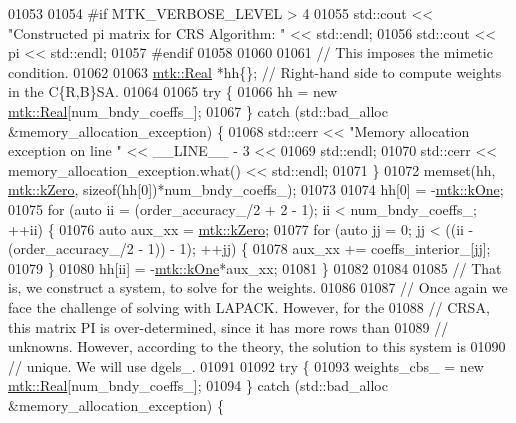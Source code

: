 \begin{DoxyCode}
{{01053 
01054 \textcolor{preprocessor}{  #if MTK\_VERBOSE\_LEVEL > 4}
01055   std::cout << \textcolor{stringliteral}{"Constructed pi matrix for CRS Algorithm: "} << std::endl;
01056   std::cout << pi << std::endl;
01057 \textcolor{preprocessor}{  #endif}
01058 
01060 
01061   \textcolor{comment}{// This imposes the mimetic condition.}
01062 
01063   \hyperlink{group__c01-roots_gac080bbbf5cbb5502c9f00405f894857d}{mtk::Real} *hh\{\};  \textcolor{comment}{// Right-hand side to compute weights in the C\{R,B\}SA.}
01064 
01065   \textcolor{keywordflow}{try} \{
01066     hh = \textcolor{keyword}{new} \hyperlink{group__c01-roots_gac080bbbf5cbb5502c9f00405f894857d}{mtk::Real}[num\_bndy\_coeffs\_];
01067   \} \textcolor{keywordflow}{catch} (std::bad\_alloc &memory\_allocation\_exception) \{
01068     std::cerr << \textcolor{stringliteral}{"Memory allocation exception on line "} << \_\_LINE\_\_ - 3 <<
01069       std::endl;
01070     std::cerr << memory\_allocation\_exception.what() << std::endl;
01071   \}
01072   memset(hh, \hyperlink{group__c01-roots_ga59a451a5fae30d59649bcda274fea271}{mtk::kZero}, \textcolor{keyword}{sizeof}(hh[0])*num\_bndy\_coeffs\_);
01073 
01074   hh[0] = -\hyperlink{group__c01-roots_ga26407c24d43b6b95480943340d285c71}{mtk::kOne};
01075   \textcolor{keywordflow}{for} (\textcolor{keyword}{auto} ii = (order\_accuracy\_/2 + 2 - 1); ii < num\_bndy\_coeffs\_; ++ii) \{
01076     \textcolor{keyword}{auto} aux\_xx = \hyperlink{group__c01-roots_ga59a451a5fae30d59649bcda274fea271}{mtk::kZero};
01077     \textcolor{keywordflow}{for} (\textcolor{keyword}{auto} jj = 0; jj < ((ii - (order\_accuracy\_/2 - 1)) - 1); ++jj) \{
01078       aux\_xx += coeffs\_interior\_[jj];
01079     \}
01080     hh[ii] = -\hyperlink{group__c01-roots_ga26407c24d43b6b95480943340d285c71}{mtk::kOne}*aux\_xx;
01081   \}
01082 
01084 
01085   \textcolor{comment}{// That is, we construct a system, to solve for the weights.}
01086 
01087   \textcolor{comment}{// Once again we face the challenge of solving with LAPACK. However, for the}
01088   \textcolor{comment}{// CRSA, this matrix PI is over-determined, since it has more rows than}
01089   \textcolor{comment}{// unknowns. However, according to the theory, the solution to this system is}
01090   \textcolor{comment}{// unique. We will use dgels\_.}
01091 
01092   \textcolor{keywordflow}{try} \{
01093     weights\_cbs\_ = \textcolor{keyword}{new} \hyperlink{group__c01-roots_gac080bbbf5cbb5502c9f00405f894857d}{mtk::Real}[num\_bndy\_coeffs\_];
01094   \} \textcolor{keywordflow}{catch} (std::bad\_alloc &memory\_allocation\_exception) \{
}}
\end{DoxyCode}
